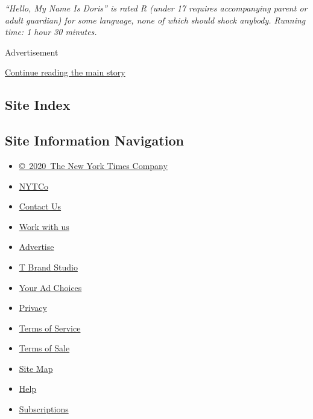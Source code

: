 \emph{``Hello, My Name Is Doris'' is rated R (under 17 requires
accompanying parent or adult guardian) for some language, none of which
should shock anybody. Running time: 1 hour 30 minutes.}

Advertisement

\protect\hyperlink{after-bottom}{Continue reading the main story}

\hypertarget{site-index}{%
\subsection{Site Index}\label{site-index}}

\hypertarget{site-information-navigation}{%
\subsection{Site Information
Navigation}\label{site-information-navigation}}

\begin{itemize}
\tightlist
\item
  \href{https://help.nytimes.com/hc/en-us/articles/115014792127-Copyright-notice}{©~2020~The
  New York Times Company}
\end{itemize}

\begin{itemize}
\tightlist
\item
  \href{https://www.nytco.com/}{NYTCo}
\item
  \href{https://help.nytimes.com/hc/en-us/articles/115015385887-Contact-Us}{Contact
  Us}
\item
  \href{https://www.nytco.com/careers/}{Work with us}
\item
  \href{https://nytmediakit.com/}{Advertise}
\item
  \href{http://www.tbrandstudio.com/}{T Brand Studio}
\item
  \href{https://www.nytimes.com/privacy/cookie-policy\#how-do-i-manage-trackers}{Your
  Ad Choices}
\item
  \href{https://www.nytimes.com/privacy}{Privacy}
\item
  \href{https://help.nytimes.com/hc/en-us/articles/115014893428-Terms-of-service}{Terms
  of Service}
\item
  \href{https://help.nytimes.com/hc/en-us/articles/115014893968-Terms-of-sale}{Terms
  of Sale}
\item
  \href{https://spiderbites.nytimes.com}{Site Map}
\item
  \href{https://help.nytimes.com/hc/en-us}{Help}
\item
  \href{https://www.nytimes.com/subscription?campaignId=37WXW}{Subscriptions}
\end{itemize}
